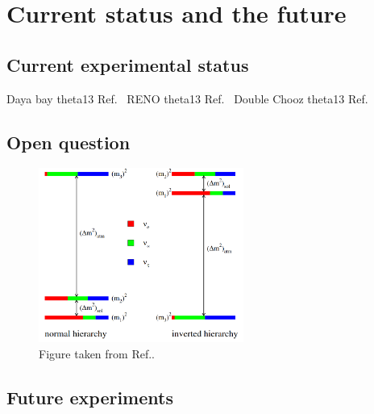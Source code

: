 \section{Current status and the future}
\label{sec:theory_status}

\subsection{Current experimental status}

Daya bay theta13 Ref.~\cite{an2012}
RENO theta13 Ref.~\cite{ahn2012}
Double Chooz theta13 Ref.~\cite{abe2012}

\subsection{Open question}

\begin{figure} %
    \includegraphics[origin=c,width=0.6\textwidth]{diagrams/3-theory/hierarchy.png}
    \caption[hierarchy short]
    {Figure taken from Ref.\cite{gouvea2013}.}
    \label{fig:hierarchy}
\end{figure} %


\subsection{Future experiments}


